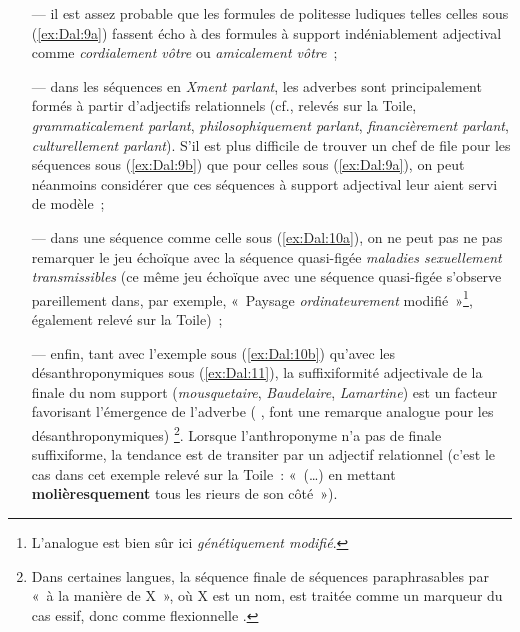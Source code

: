 \documentclass[output=paper]{langsci/langscibook}
\begin{document}
\begin{itemize}
\item[---] il est assez probable que les formules de politesse ludiques telles celles sous (\ref{ex:Dal:9a}) fassent écho à des formules à support indéniablement adjectival comme \emph{cordialement vôtre} ou \emph{amicalement vôtre}~;

\item[---] dans les séquences en \emph{Xment parlant}, les adverbes sont principalement formés à partir d'adjectifs relationnels (cf., relevés sur la Toile, \emph{grammaticalement parlant}, \emph{philosophiquement parlant}, \emph{financièrement parlant}, \emph{culturellement parlant}). S'il est plus difficile de trouver un chef de file pour les séquences sous (\ref{ex:Dal:9b}) que pour celles sous (\ref{ex:Dal:9a}), on peut néanmoins considérer que ces séquences à support adjectival leur aient servi de modèle~;

\item[---] dans une séquence comme celle sous (\ref{ex:Dal:10a}), on ne peut pas ne pas remarquer le jeu échoïque avec la séquence quasi-figée \emph{maladies sexuellement transmissibles} (ce même jeu échoïque avec une séquence quasi-figée s'observe pareillement dans, par exemple, «~Paysage \emph{ordinateurement} modifié~»\footnote{L'analogue est bien sûr ici \emph{génétiquement modifié}.}, également relevé sur la Toile)~;

\item[---] enfin, tant avec l'exemple sous (\ref{ex:Dal:10b}) qu'avec les désanthroponymiques sous (\ref{ex:Dal:11}), la suffixiformité adjectivale de la finale du nom support (\emph{mousque\-taire}, \emph{Baudelaire}, \emph{Lamartine}) est un facteur favorisant l'émergence de l'adverbe %
(%
\citeauthor{Amiot05}%
%
, font une remarque analogue pour les désanthroponymiques)
%
\footnote{Dans certaines langues, la séquence finale de séquences paraphrasables par «~à la manière de X~», où X est un nom, est traitée comme un marqueur du cas essif, donc comme flexionnelle %
\citep[par exemple, en hongrois --\emph{kent} dans \emph{turistakent} «~à la manière d'un touriste~»~; cf. ][1399]{Ricca15}%
%
.}. Lorsque l'anthroponyme n'a pas de finale suffixiforme, la tendance est de transiter par un adjectif relationnel (c'est le cas dans cet exemple relevé sur la Toile~: «~(\ldots{}) en mettant \textbf{molièresquement} tous les rieurs de son côté~»).

\end{itemize}
\end{document}
